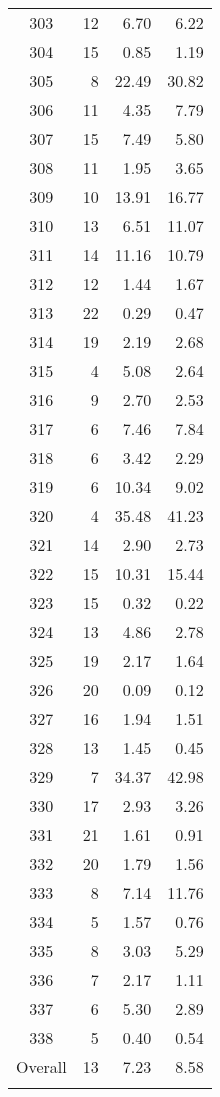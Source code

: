 \begin{longtable}{c r r r}
  303 & 12  & 6.70 & 6.22 \\ 
  304 & 15  & 0.85 & 1.19 \\ 
  305 & 8  & 22.49 & 30.82 \\ 
  306 & 11  & 4.35 & 7.79 \\ 
  307 & 15  & 7.49 & 5.80 \\ 
  308 & 11  & 1.95 & 3.65 \\ 
  309 & 10  & 13.91 & 16.77 \\ 
  310 & 13  & 6.51 & 11.07 \\ 
  311 & 14  & 11.16 & 10.79 \\ 
  312 & 12  & 1.44 & 1.67 \\ 
  313 & 22  & 0.29 & 0.47 \\ 
  314 & 19  & 2.19 & 2.68 \\ 
  315 & 4  & 5.08 & 2.64 \\ 
  316 & 9  & 2.70 & 2.53 \\ 
  317 & 6  & 7.46 & 7.84 \\ 
  318 & 6  & 3.42 & 2.29 \\ 
  319 & 6  & 10.34 & 9.02 \\ 
  320 & 4  & 35.48 & 41.23 \\ 
  321 & 14  & 2.90 & 2.73 \\ 
  322 & 15  & 10.31 & 15.44 \\ 
  323 & 15  & 0.32 & 0.22 \\ 
  324 & 13  & 4.86 & 2.78 \\ 
  325 & 19  & 2.17 & 1.64 \\ 
  326 & 20  & 0.09 & 0.12 \\ 
  327 & 16  & 1.94 & 1.51 \\ 
  328 & 13  & 1.45 & 0.45 \\ 
  329 & 7  & 34.37 & 42.98 \\ 
  330 & 17  & 2.93 & 3.26 \\ 
  331 & 21  & 1.61 & 0.91 \\ 
  332 & 20  & 1.79 & 1.56 \\ 
  333 & 8  & 7.14 & 11.76 \\ 
  334 & 5  & 1.57 & 0.76 \\ 
  335 & 8  & 3.03 & 5.29 \\ 
  336 & 7  & 2.17 & 1.11 \\ 
  337 & 6  & 5.30 & 2.89 \\ 
  338 & 5  & 0.40 & 0.54 \\ 
  Overall & 13  & 7.23 & 8.58 \\ 
   \hline
\hline

\label{tab:hru_area}
\end{longtable}
